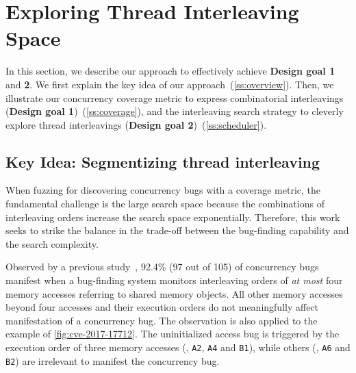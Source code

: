 \section {Exploring Thread Interleaving Space}
\label{s:design}

In this section, we describe our approach to effectively achieve
\textbf{Design goal 1} and \textbf{2}.
%
We first explain the key idea of our approach~(\autoref{ss:overview}).
Then, we illustrate our concurrency coverage metric to express
combinatorial interleavings (\textbf{Design goal
  1})~(\autoref{ss:coverage}), and the interleaving search strategy to
cleverly explore thread interleavings (\textbf{Design goal
  2})~(\autoref{ss:scheduler}).


\subsection{Key Idea: Segmentizing thread interleaving}
\label{ss:overview}


When fuzzing for discovering concurrency bugs with a coverage metric,
the fundamental challenge is the large search space because the
combinations of interleaving orders increase the search space
exponentially.
%
Therefore, this work seeks to strike the balance in the trade-off
between the bug-finding capability and the search complexity.

Observed by a previous study~\cite{learningfrommistakes}, 92.4\% (97
out of 105) of concurrency bugs manifest when a bug-finding system
monitors interleaving orders of \textit{at most} four memory accesses
referring to shared memory objects.
%
All other memory accesses beyond four accesses and their execution
orders do not meaningfully affect manifestation of a concurrency bug.
%
The observation is also applied to the example of
\autoref{fig:cve-2017-17712}. The uninitialized access bug is
triggered by the execution order of three memory accesses (\eg,
\texttt{A2}, \texttt{A4} and \texttt{B1}), while others (\eg,
\texttt{A6} and \texttt{B2}) are irrelevant to manifest the
concurrency bug.


